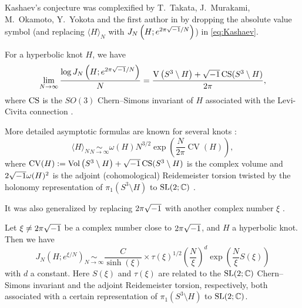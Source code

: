 \par
Kashaev's conjecture was complexified by T.~Takata, J.~Murakami, M.~Okamoto, Y.~Yokota and the first author in \cite{Murakami/Murakami/Okamoto/Takata/Yokota:EXPMA02} by dropping the absolute value symbol (and replacing $\langle H\rangle_{N}$ with $J_{N}\left(H;e^{2\pi\sqrt{-1}/N}\right)$) in \eqref{eq:Kashaev}.
\begin{conj}
For a hyperbolic knot $H$, we have
\begin{equation}\label{eq:CVC}
  \lim_{N\to\infty}
  \frac{\log J_{N}\left(H;e^{2\pi\sqrt{-1}/N}\right)}{N}
  =
  \frac{\operatorname{V}\left(S^3\setminus{H}\right)+\sqrt{-1}\operatorname{CS}(S^3\setminus{H})}{2\pi},
\end{equation}
where $\operatorname{CS}$ is the $SO(3)$ Chern--Simons invariant of $H$ associated with the Levi-Civita connection \cite{Meyerhoff:LMSLN112}.
\end{conj}
\par
More detailed asymptotic formulas are known for several knots \cite{Andersen/Hansen:JKNOT2006,Ohtsuki:QT2016,Ohtsuki/Yokota:MATPC2018}:
\begin{equation*}
  \langle H\rangle_{N}
  \underset{N\to\infty}{\sim}
  \omega(H)N^{3/2}\exp\left(\frac{N}{2\pi}\operatorname{CV}(H)\right),
\end{equation*}
where $\operatorname{CV}(H):=\operatorname{Vol}\left(S^3\setminus{H}\right)+\sqrt{-1}\operatorname{CS}(S^3\setminus{H})$ is the complex volume and $2\sqrt{-1}\omega(H)^2$ is the adjoint (cohomological) Reidemeister torsion twisted by the holonomy representation of $\pi_1(S^3\setminus{H})$ to $\rm{SL}(2;\mathbb{C})$ \cite{Ohtsuki/Takata:GEOTO2015}.
\par
It was also generalized by replacing $2\pi\sqrt{-1}$ with another complex number $\xi$ \cite{Dimofte/Gukov/Lenells/Zagier:CNTP2010,Murakami:JTOP2013}.
\begin{conj}
Let $\xi\ne2\pi\sqrt{-1}$ be a complex number close to $2\pi\sqrt{-1}$, and $H$ a hyperbolic knot.
Then we have
\begin{equation}\label{eq:GVC}
  J_{N}\left(H;e^{\xi/N}\right)
  \underset{N\to\infty}{\sim}
  \frac{C}{\sinh(\xi)}\times\tau(\xi)^{1/2}\left(\frac{N}{\xi}\right)^d
  \exp\left(\frac{N}{\xi}S(\xi)\right)
\end{equation}
with $d$ a constant.
Here $S(\xi)$ and $\tau(\xi)$ are related to the $\rm{SL}(2;\mathbb{C})$ Chern--Simons invariant and the adjoint Reidemeister torsion, respectively, both associated with a certain representation of $\pi_1(S^3\setminus{H})$ to $\rm{SL}(2;\mathbb{C})$.
\end{conj}
